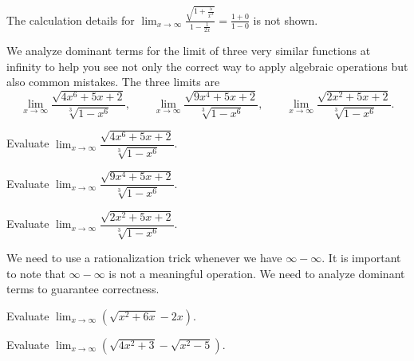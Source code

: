 \documentclass[../main.tex]{subfiles}
\begin{document}
The calculation details for \(\lim_{x \to \infty} \frac{\sqrt{1 + \frac{5}{x^{3}}}}{1 - \frac{1}{2x}} = \frac{1+0}{1-0}\) is not shown.

\clearpage

%   

We analyze dominant terms for the limit of three very similar functions at infinity to help you see not only the correct way to apply algebraic operations but also common mistakes. The three limits are
\[
  \lim_{x \to \infty} \dfrac{\sqrt{4x^{6} + 5x + 2}}{\sqrt[3]{1 - x^{6}}},
  \qquad
  \lim_{x \to \infty} \dfrac{\sqrt{9x^{4} + 5x + 2}}{\sqrt[3]{1 - x^{6}}},
  \qquad
  \lim_{x \to \infty} \dfrac{\sqrt{2x^{2} + 5x + 2}}{\sqrt[3]{1 - x^{6}}}.
\]

\begin{example}\label{eg:dom-term-intro-infinity}
  Evaluate \(\lim_{x \to \infty} \dfrac{\sqrt{4x^{6} + 5x + 2}}{\sqrt[3]{1 - x^{6}}}\).

  \blanks*
\end{example}

\begin{example}\label{eg:dom-term-intro-constant}
  Evaluate \(\lim_{x \to \infty} \dfrac{\sqrt{9x^{4} + 5x + 2}}{\sqrt[3]{1 - x^{6}}}\).

  \blanks*
\end{example}
\clearpage

\begin{example}\label{eg:dom-term-intro-zero}
  Evaluate \(\lim_{x \to \infty} \dfrac{\sqrt{2x^{2} + 5x + 2}}{\sqrt[3]{1 - x^{6}}}\).

  \blanks*
\end{example}

\faStar{} We need to use a rationalization trick whenever we have \(\infty - \infty\). It is important to note that \(\infty - \infty\) is not a meaningful operation. We need to analyze dominant terms to guarantee correctness.

\begin{example}\label{eg:dom-term-difference-of-roots}
  Evaluate \(\lim_{x \to \infty} \left( \sqrt{x^{2} + 6x} - 2x\right)\).

  \blanks*
\end{example}
\clearpage

\begin{exercise}\label{ex:dom-term-difference-zero}
  Evaluate \(\lim_{x \to \infty} \left( \sqrt{4x^{2} + 3} - \sqrt{x^{2} - 5} \right)\).

  \blanks*
\end{exercise}
\end{document}
